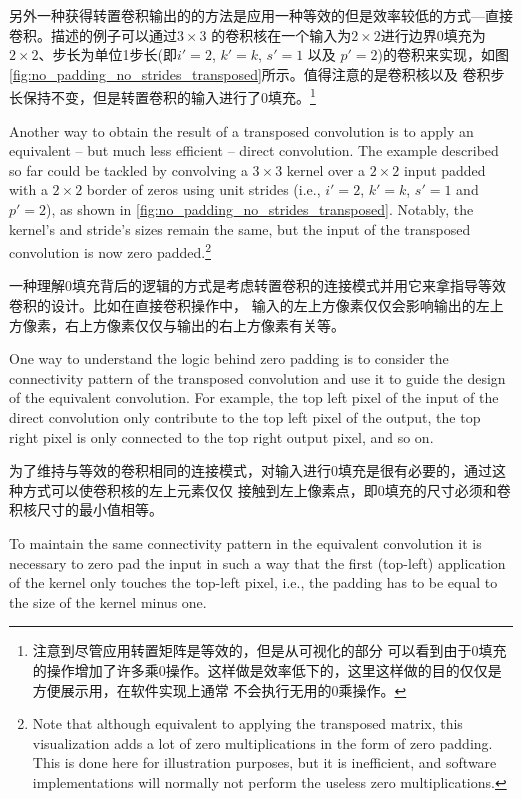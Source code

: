 \documentclass[notitlepage]{report}
\begin{document}
另外一种获得转置卷积输出的的方法是应用一种等效的但是效率较低的方式---直接卷积。描述的例子可以通过$3 \times 3$
的卷积核在一个输入为$2 \times 2$进行边界0填充为$2 \times 2$、步长为单位1步长(即$i' = 2$, $k' = k$, $s' = 1$ 
以及 $p' = 2$)的卷积来实现，如图\autoref{fig:no_padding_no_strides_transposed}所示。值得注意的是卷积核以及
卷积步长保持不变，但是转置卷积的输入进行了0填充。\footnote{注意到尽管应用转置矩阵是等效的，但是从可视化的部分
可以看到由于0填充的操作增加了许多乘0操作。这样做是效率低下的，这里这样做的目的仅仅是方便展示用，在软件实现上通常
不会执行无用的0乘操作。}


Another way to obtain the result of a transposed convolution is to apply an
equivalent -- but much less efficient -- direct convolution. The example
described so far could be tackled by convolving a $3 \times 3$ kernel over a
$2 \times 2$ input padded with a $2 \times 2$ border of zeros using unit
strides (i.e., $i' = 2$, $k' = k$, $s' = 1$ and $p' = 2$), as shown in
\autoref{fig:no_padding_no_strides_transposed}. Notably, the kernel's and
stride's sizes remain the same, but the input of the transposed convolution is
now zero padded.\footnote{Note that although
    equivalent to applying the transposed matrix, this visualization adds a lot
    of zero multiplications in the form of zero padding.  This is done here for
    illustration purposes, but it is inefficient, and software implementations
    will normally not perform the useless zero multiplications.}

一种理解0填充背后的逻辑的方式是考虑转置卷积的连接模式并用它来拿指导等效卷积的设计。比如在直接卷积操作中，
输入的左上方像素仅仅会影响输出的左上方像素，右上方像素仅仅与输出的右上方像素有关等。

One way to understand the logic behind zero padding is to consider the
connectivity pattern of the transposed convolution and use it to guide the
design of the equivalent convolution. For example, the top left pixel of the
input of the direct convolution only contribute to the top left pixel of the
output, the top right pixel is only connected to the top right output pixel,
and so on.

为了维持与等效的卷积相同的连接模式，对输入进行0填充是很有必要的，通过这种方式可以使卷积核的左上元素仅仅
接触到左上像素点，即0填充的尺寸必须和卷积核尺寸的最小值相等。

To maintain the same connectivity pattern in the equivalent convolution it is
necessary to zero pad the input in such a way that the first (top-left)
application of the kernel only touches the top-left pixel, i.e., the padding
has to be equal to the size of the kernel minus one.
\end{document}
